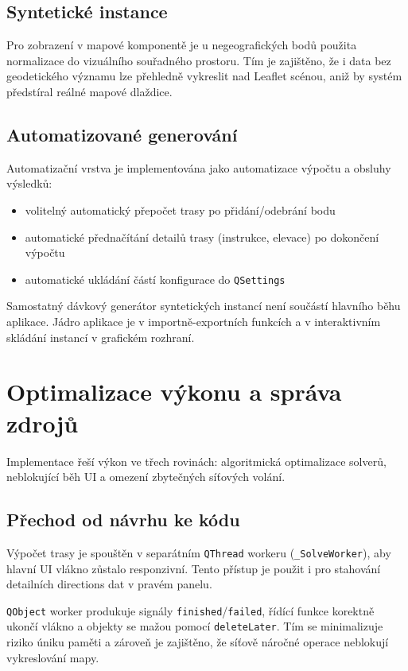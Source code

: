 \subsection{Syntetické instance}
Pro zobrazení v mapové komponentě je u negeografických bodů použita normalizace do vizuálního souřadného prostoru. Tím je zajištěno, že i data bez geodetického významu lze přehledně vykreslit nad Leaflet scénou, aniž by systém předstíral reálné mapové dlaždice.

\subsection{Automatizované generování}
Automatizační vrstva je implementována jako automatizace výpočtu a obsluhy výsledků:
\begin{itemize}
    \item volitelný automatický přepočet trasy po přidání/odebrání bodu
    \item automatické přednačítání detailů trasy (instrukce, elevace) po dokončení výpočtu
    \item automatické ukládání částí konfigurace do \texttt{QSettings}
\end{itemize}

Samostatný dávkový generátor syntetických instancí není součástí hlavního běhu aplikace. Jádro aplikace je v importně-exportních funkcích a v interaktivním skládání instancí v grafickém rozhraní.

\section{Optimalizace výkonu a správa zdrojů}
\label{sec:implementace_vykonu}
Implementace řeší výkon ve třech rovinách: algoritmická optimalizace solverů, neblokující běh UI a omezení zbytečných síťových volání.

\subsection{Přechod od návrhu ke kódu}
Výpočet trasy je spouštěn v separátním \texttt{QThread} workeru (\texttt{\_SolveWorker}), aby hlavní UI vlákno zůstalo responzivní. Tento přístup je použit i pro stahování detailních directions dat v pravém panelu.

\texttt{QObject} worker produkuje signály \texttt{finished}/\texttt{failed}, řídící funkce korektně ukončí vlákno a objekty se mažou pomocí \texttt{deleteLater}. Tím se minimalizuje riziko úniku paměti a zároveň je zajištěno, že síťově náročné operace neblokují vykreslování mapy.


